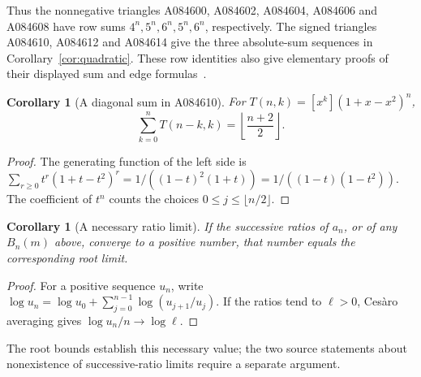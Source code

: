 \documentclass[11pt]{article}
\newtheorem{corollary}[theorem]{Corollary}
\begin{document}
Thus the nonnegative triangles A084600, A084602, A084604, A084606 and
A084608 have row sums $4^n,5^n,6^n,5^n,6^n$, respectively.
The signed triangles A084610, A084612 and A084614 give the three
absolute-sum sequences in Corollary~\ref{cor:quadratic}. These row
identities also give elementary proofs of their displayed sum and edge
formulas~\cite{hanna-triangles}.

\begin{corollary}[A diagonal sum in A084610]\label{cor:diagonal}
For $T(n,k)=[x^k](1+x-x^2)^n$,
\[
 \sum_{k=0}^nT(n-k,k)=\left\lfloor\frac{n+2}{2}\right\rfloor.
\]
\end{corollary}
\begin{proof}
The generating function of the left side is
$\sum_{r\geq0}t^r(1+t-t^2)^r
=1/((1-t)^2(1+t))=1/((1-t)(1-t^2))$.
The coefficient of $t^n$ counts the choices $0\leq j\leq\lfloor n/2\rfloor$.
\end{proof}

\begin{corollary}[A necessary ratio limit]\label{cor:ratio}
If the successive ratios of $a_n$, or of any $B_n(m)$ above, converge
to a positive number, that number equals the corresponding root limit.
\end{corollary}
\begin{proof}
For a positive sequence $u_n$, write
$\log u_n=\log u_0+\sum_{j=0}^{n-1}\log(u_{j+1}/u_j)$.
If the ratios tend to $\ell>0$, Ces\`aro averaging gives
$\log u_n/n\to\log\ell$.
\end{proof}
The root bounds establish this necessary value; the two source statements
about nonexistence of successive-ratio limits require a separate argument.
\end{document}

